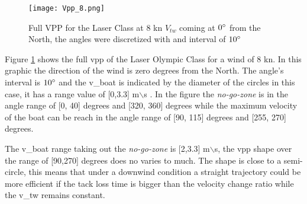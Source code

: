 \par
\begin{figure}[hbt!]
    \centering
    \texttt{[image: Vpp\_8.png]}
    \caption{Full VPP for the Laser Class at 8 kn $V_{tw}$ coming at $0\degree$ from the North, the angles were discretized with and interval of $10\degree$} 
    \label{fig:Laser_Full_Vpp85}
\end{figure}
Figure \ref{fig:Laser_Full_Vpp85} shows the full \acrshort{vpp} of the Laser Olympic Class for a wind of 8 kn. In this graphic the direction of the wind is zero degrees from the North. The angle's interval is $10\degree$ and the \acrshort{v_boat} is indicated by the diameter of the circles in this case, it has a range value of [0,3.3] m$\backslash$s . In the figure the \textit{no-go-zone} is in the angle range of [0, 40] degrees and [320, 360] degrees while the maximum velocity of the boat can be reach in the angle range of [90, 115] degrees and [255, 270] degrees. \par 
\noindent
The \acrshort{v_boat} range taking out the \textit{no-go-zone} is [2,3.3] m$\backslash$s, the \acrshort{vpp} shape over the range of [90,270] degrees does no varies to much. The shape is close to a semi-circle, this means that under a downwind condition a straight trajectory could be more efficient if the tack loss time is bigger than the velocity change ratio while the \acrshort{v_tw} remains constant.  \par  

